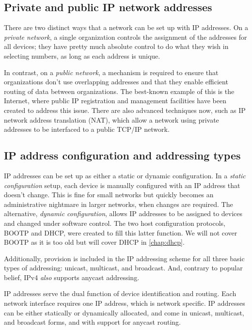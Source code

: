\subsection{Private and public IP network addresses}

There are two distinct ways that a network can be set up with IP addresses.
On a {\emph{private network}}, a single organization controls the assignment of the addresses for all devices; they have pretty much absolute control to do what they wish in selecting numbers, as long as each address is unique.

In contrast, on a {\emph{public network}}, a mechanism is required to ensure that organizations don't use overlapping addresses and that they enable efficient routing of data between organizations.
The best-known example of this is the Internet, where public IP registration and management facilities have been created to address this issue.
There are also advanced techniques now, such as IP network address translation (NAT), which allow a network using private addresses to be interfaced to a public TCP/IP network.



\subsection{IP address configuration and addressing types}

IP addresses can be set up as either a static or dynamic configuration.
In a {\emph{static configuration}} setup, each device is manually configured with an IP address that doesn't change.
This is fine for small networks but quickly becomes an administrative nightmare in larger networks, when changes are required.
The alternative, {\emph{dynamic configuration}}, allows IP addresses to be assigned to devices and changed under software control.
The two host configuration protocols, BOOTP and DHCP, were created to fill this latter function.
We will not cover BOOTP as it is too old but will cover DHCP in \vref{chap:dhcp}.

Additionally, provision is included in the IP addressing scheme for all three basic types of addressing: unicast, multicast, and broadcast.
And, contrary to popular belief, IPv4 \emph{also} supports anycast addressing.

\begin{keyconcept}
IP addresses serve the dual function of device identification and routing.
Each network interface requires one IP address, which is network specific.
IP addresses can be either statically or dynamically allocated, and come in unicast, multicast, and broadcast forms, and with support for anycast routing.
\end{keyconcept}


